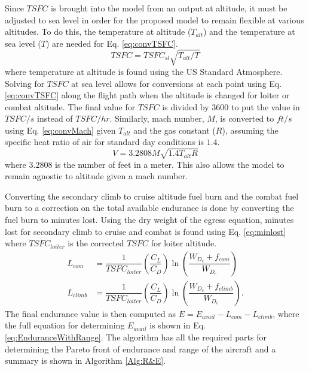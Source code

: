 Since $TSFC$ is brought into the model from an output at altitude, it must be adjusted to sea level in order for the proposed model to remain flexible at various altitudes. To do this, the temperature at altitude ($T_{alt}$) and the temperature at sea level ($T$) are needed for Eq. \ref{eq:convTSFC}.
\begin{equation}
    TSFC = TSFC_{sl}\sqrt{T_{alt}/T}
    \label{eq:convTSFC}
\end{equation}
where temperature at altitude is found using the US Standard Atmosphere.
Solving for $TSFC$ at sea level allows for conversions at each point  using Eq. \ref{eq:convTSFC} along the flight path when the altitude is changed for loiter or combat altitude. The final value for $TSFC$ is divided by $3600$ to put the value in $TSFC/s$ instead of $TSFC/hr$. Similarly, mach number, $M$, is converted to $ft/s$ using Eq. \ref{eq:convMach} given $T_{alt}$ and the gas constant ($R$), assuming the specific heat ratio of air for standard day conditions is $1.4$.
\begin{equation}
    V = 3.2808M\sqrt{1.4T_{alt}R}
    \label{eq:convMach}
\end{equation}
where $3.2808$ is the number of feet in a meter. This also allows the model to remain agnostic to altitude given a mach number.\par
Converting the secondary climb to cruise altitude fuel burn and the combat fuel burn to a correction on the total available endurance is done by converting the fuel burn to minutes lost. Using the dry weight of the egress equation, minutes lost for secondary climb to cruise and combat is found using Eq. \ref{eq:minlost} where $TSFC_{loiter}$ is the corrected $TSFC$ for loiter altitude.
\begin{equation}
\label{eq:minlost}
\begin{aligned}
    L_{com} &= \dfrac{1}{TSFC_{loiter}}\left(\dfrac{C_L}{C_D}\right)\ln\left(\dfrac{W_{D_{e}}+f_{com}}{W_{D_{e}}}\right)\\
    L_{climb} &=\dfrac{1}{TSFC_{loiter}}\left(\dfrac{C_L}{C_D}\right)\ln\left(\dfrac{W_{D_{e}}+f_{climb}}{W_{D_{e}}}\right).
\end{aligned}
\end{equation}
The final endurance value is then computed as $E = E_{avail}-L_{com}-L_{climb}$, where the full equation for determining $E_{avail}$ is shown in Eq. \ref{eq:EnduranceWithRange}. The algorithm has all the required parts for determining the Pareto front of endurance and range of the aircraft and a summary is shown in Algorithm \ref{Alg:R&E}. 
